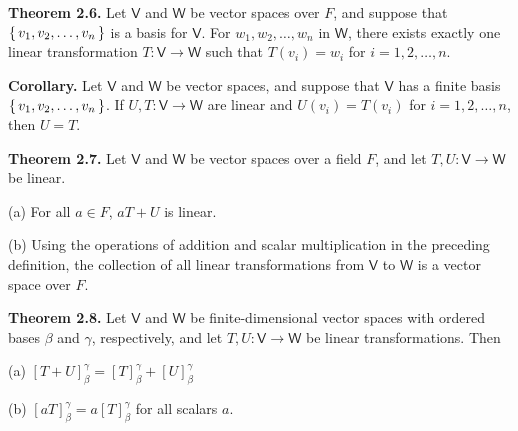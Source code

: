 \documentclass{article}
\newcommand{\0}{\mathit{0}}
\begin{document}
\medskip

\textbf{Theorem 2.6.} Let $\mathsf{V}$ and $\mathsf{W}$ be vector spaces over $F$, and suppose that 
$\set{v_1, v_2, \dots, v_n}$ is a basis for $\mathsf{V}$. 
For $w_1, w_2, \dots, w_n$ in $\mathsf{W}$, there exists exactly one linear transformation 
$T: \mathsf{V} \to \mathsf{W}$ such that $T(v_i) = w_i$ for $i = 1, 2, \dots, n$.

\medskip

\textbf{Corollary.} Let $\mathsf{V}$ and $\mathsf{W}$ be vector spaces, and suppose that 
$\mathsf{V}$ has a finite basis $\set{v_1, v_2, \dots, v_n}$. 
If $U, T: \mathsf{V} \to \mathsf{W}$ are linear and $U(v_i) = T(v_i)$ for 
$i = 1, 2, \dots, n$, then $U = T$.

\medskip

\textbf{Theorem 2.7.} Let $\mathsf{V}$ and $\mathsf{W}$ be vector spaces over a field $F$, 
and let $T, U: \mathsf{V} \to \mathsf{W}$ be linear. 

(a) For all $a \in F$, $aT + U$ is linear. 

(b) Using the operations of addition and scalar multiplication in the preceding 
definition, the collection of all linear transformations from $\mathsf{V}$ to 
$\mathsf{W}$ is a vector space over $F$.

\medskip

\textbf{Theorem 2.8.} Let $\mathsf{V}$ and $\mathsf{W}$ be finite-dimensional vector spaces 
with ordered bases $\beta$ and $\gamma$, respectively, and let $T, U: \mathsf{V} \to \mathsf{W}$ 
be linear transformations. Then

(a) $\left[ T + U \right]^\gamma_\beta = \left[ T \right]^\gamma_\beta + \left[ U \right]^\gamma_\beta$

(b) $\left[ aT \right]^\gamma_\beta = a \left[ T \right]^\gamma_\beta$ for all scalars $a$.
\end{document}
